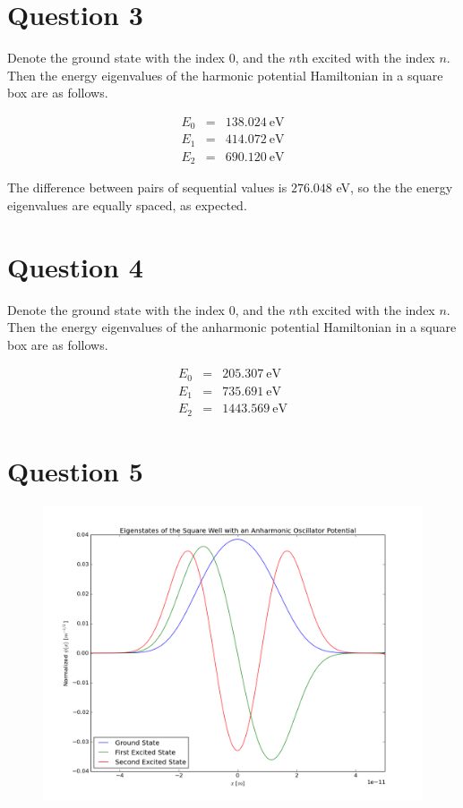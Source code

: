 \documentclass[a4paper,12pt]{article}
\begin{document}
\section{Question 3}

Denote the ground state with the index 0, and the $n$th excited with the index $n$. Then the energy eigenvalues of the harmonic potential Hamiltonian in a square box are as follows.

\begin{eqnarray}
E_0 &=& 138.024 \:\mathrm{eV}\nonumber\\
E_1 &=& 414.072 \:\mathrm{eV}\nonumber\\
E_2 &=& 690.120 \:\mathrm{eV}\nonumber
\end{eqnarray}

The difference between pairs of sequential values is $276.048$ eV, so the the energy eigenvalues are equally spaced, as expected.

\section{Question 4}

Denote the ground state with the index 0, and the $n$th excited with the index $n$. Then the energy eigenvalues of the anharmonic potential Hamiltonian in a square box are as follows.

\begin{eqnarray}
E_0 &=& 205.307 \:\mathrm{eV}\nonumber\\
E_1 &=& 735.691 \:\mathrm{eV}\nonumber\\
E_2 &=& 1443.569 \:\mathrm{eV}\nonumber
\end{eqnarray}

\section{Question 5}

\begin{figure}[H]
\centering
\includegraphics[width = \linewidth]{lab7q5.png}
\caption{}
\label{fig:q5}
\end{figure}
\end{document}
